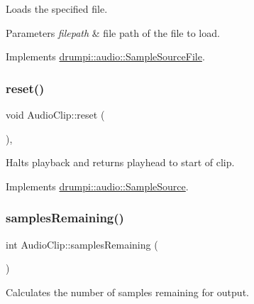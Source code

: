 Loads the specified file. 
\begin{DoxyParams}{Parameters}
{\em filepath} & file path of the file to load. \\
\hline
\end{DoxyParams}


Implements \hyperlink{classdrumpi_1_1audio_1_1SampleSourceFile_a3a919325368cd163435f5ea6ad9fd4ec}{drumpi\+::audio\+::\+Sample\+Source\+File}.

\mbox{\label{classdrumpi_1_1audio_1_1AudioClip_ac870bf37050afae302754c4e4671d779}} 
\subsubsection{\texorpdfstring{reset()}{reset()}}
{\footnotesize\ttfamily void Audio\+Clip\+::reset (\begin{DoxyParamCaption}{ }\end{DoxyParamCaption})\hspace{0.3cm}{\ttfamily [override]}, {\ttfamily [virtual]}}

Halts playback and returns playhead to start of clip. 

Implements \hyperlink{classdrumpi_1_1audio_1_1SampleSource_aa7b214c99ee55ceac758fdef44b0cd6d}{drumpi\+::audio\+::\+Sample\+Source}.

\mbox{\label{classdrumpi_1_1audio_1_1AudioClip_a04519734485d53672fe56ddac590b428}} 
\subsubsection{\texorpdfstring{samples\+Remaining()}{samplesRemaining()}}
{\footnotesize\ttfamily int Audio\+Clip\+::samples\+Remaining (\begin{DoxyParamCaption}{ }\end{DoxyParamCaption})\hspace{0.3cm}{\ttfamily [private]}}

Calculates the number of samples remaining for output. \mbox{\label{classdrumpi_1_1audio_1_1AudioClip_aeed08721b08d9443a769a99e717f5743}} 
